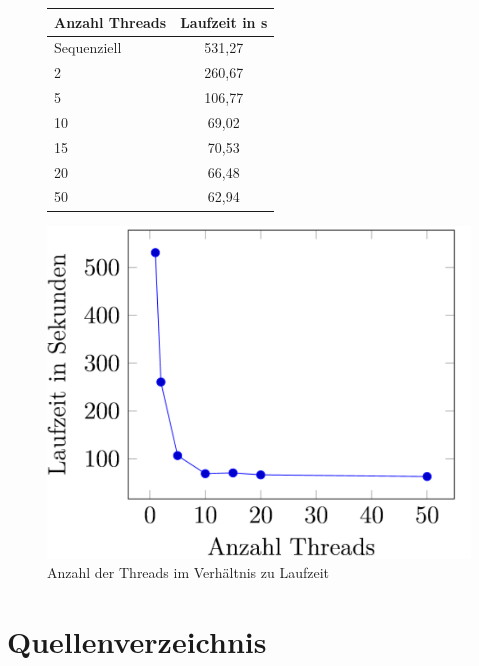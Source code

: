 \begin{figure}[!hbt]
	\begin{minipage}[!hbt]{5cm}
		\centering
		
		\begin{tabular}{l|c}
			\toprule
			\textbf{Anzahl Threads} & \textbf{Laufzeit in s} \\
			\midrule
			Sequenziell & 531,27 \\
			2 & 260,67 \\
			5 & 106,77 \\
			10 & 69,02 \\
			15 & 70,53 \\
			20 & 66,48 \\
			50 & 62,94 \\
			\bottomrule
		\end{tabular}
		
	\end{minipage}
	\hfill
	\begin{minipage}[!hbt]{8.2cm}
		\centering
	
		
			\includegraphics[scale=0.6]{images/laufzeiten}			 
		
	\end{minipage}
	\caption{Anzahl der Threads im Verhältnis zu Laufzeit}\label{fig.laufzeitListe}
\end{figure}



\section*{Quellenverzeichnis}
\printbibliography[type=book,heading=subbibliography,title={Bücher}]
\printbibliography[nottype=book,heading=subbibliography,title={Sonstige Quellen}]


